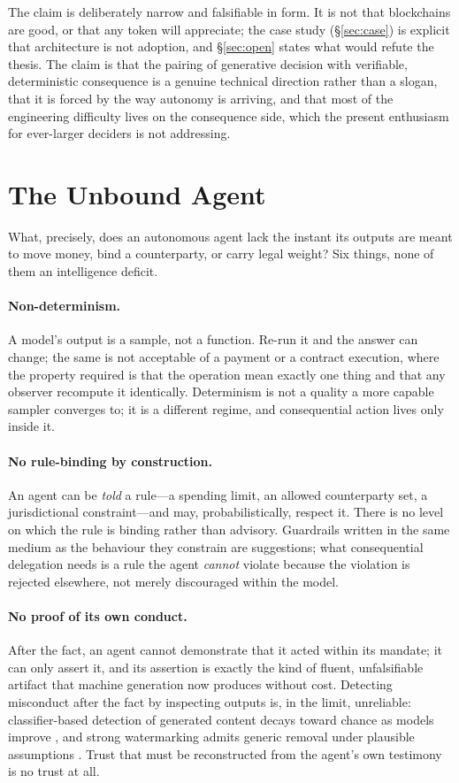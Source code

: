 \documentclass[11pt]{article}
\begin{document}
The claim is deliberately narrow and falsifiable in form. It is not that
blockchains are good, or that any token will appreciate; the case study
(\S\ref{sec:case}) is explicit that architecture is not adoption, and
\S\ref{sec:open} states what would refute the thesis. The claim is that
the pairing of generative decision with verifiable, deterministic
consequence is a genuine technical direction rather than a slogan, that
it is forced by the way autonomy is arriving, and that most of the
engineering difficulty lives on the consequence side, which the present
enthusiasm for ever-larger deciders is not addressing.

\section{The Unbound Agent}
\label{sec:gap}

What, precisely, does an autonomous agent lack the instant its outputs
are meant to move money, bind a counterparty, or carry legal weight?
Six things, none of them an intelligence deficit.

\paragraph{Non-determinism.}
A model's output is a sample, not a function. Re-run it and the answer
can change; the same is not acceptable of a payment or a contract
execution, where the property required is that the operation mean exactly
one thing and that any observer recompute it identically. Determinism is
not a quality a more capable sampler converges to; it is a different
regime, and consequential action lives only inside it.

\paragraph{No rule-binding by construction.}
An agent can be \emph{told} a rule---a spending limit, an allowed
counterparty set, a jurisdictional constraint---and may, probabilistically,
respect it. There is no level on which the rule is binding rather than
advisory. Guardrails written in the same medium as the behaviour they
constrain are suggestions; what consequential delegation needs is a rule
the agent \emph{cannot} violate because the violation is rejected
elsewhere, not merely discouraged within the model.

\paragraph{No proof of its own conduct.}
After the fact, an agent cannot demonstrate that it acted within its
mandate; it can only assert it, and its assertion is exactly the kind of
fluent, unfalsifiable artifact that machine generation now produces
without cost. Detecting misconduct after the fact by inspecting outputs
is, in the limit, unreliable: classifier-based detection of generated
content decays toward chance as models improve
\citep{sadasivan2023detection}, and strong watermarking admits generic
removal under plausible assumptions \citep{zhang2023watermarks}. Trust
that must be reconstructed from the agent's own testimony is no trust at
all.
\end{document}
